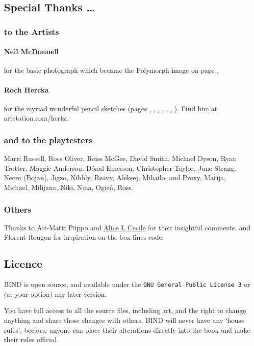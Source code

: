 \begin{multicols}{2}
\subsection*{Special Thanks \ldots}

\subsubsection*{to the Artists}

\paragraph{Neil McDonnell} for the basic photograph which became the Polymorph image on page \pageref{Roch_Hercka/polymorph},

\paragraph{Roch Hercka} for the myriad wonderful pencil sketches (pages 
\pageref{Roch_Hercka/dwarf_encumbrance}, 
\pageref{Roch_Hercka/stances}, 
\pageref{Roch_Hercka/vitals_shot}, 
\pageref{Roch_Hercka/conjuration_right}, 
\pageref{Roch_Hercka/polymorph}, 
\pageref{Roch_Hercka/dwarvish_runes}, 
\pageref{Roch_Hercka/flashing_light}
).
Find him at artstation.com/hertz.

\subsubsection*{and to the playtesters} Marri Russell, Ross Oliver, Reiss McGee, David Smith, Michael Dyson, Ryan Trotter, Maggie Anderson, 
D\'{o}nal Emerson, Christopher Taylor, June Strang, 
Necro (Bojan), Jigzo, Nibbly, Reavy, 
Aleksej, Mihailo, and Proxy,
Matija, Michael, Milijana, Niki, Nina, Ogie\'n, Ross.

\subsubsection*{Others}
Thanks to Ari-Matti Piippo and \href{https://www.twitter.com/AliceICecile}{Alice I. Cecile} for their insightful comments,
and Florent Rougon for inspiration on the box-lines code.

\subsection*{Licence}

BIND is open source, and available under the {\tt GNU General Public License 3} or (at your option) any later version.

You have full access to all the source files, including art, and the right to change anything and share those changes with others.
BIND will never have any `house rules', because anyone can place their alterations directly into the book and make their rules official.

\end{multicols}
